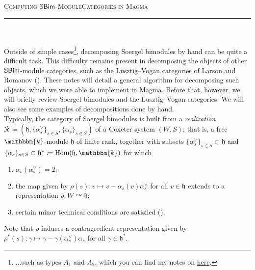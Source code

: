 



\thispagestyle{fancy}

\begin{center}
\LARGE\scshape Computing $\mathbb{S}\textup{\textsf{Bim}}$-Module\linebreak Categories in Magma\noindent\\[-\linespacing]
\rule{0.85\linewidth}{1pt}
\end{center}
\noindent\\[-0.75\linespacing]

\noindent\\ Outside of simple cases\footnote[2]{...such as types $A_1$ and $A_2$, which you can find my notes on \href{https://delphinoid.github.io/research/11/IndecomposableSoergelBimodulesA2.pdf}{here}.}, decomposing Soergel bimodules by hand can be quite a difficult task. This difficulty remains present in decomposing the objects of other $\mathbb{S}\textup{\textsf{Bim}}$-module categories, such as the Lusztig--Vogan categories of Larson and Romanov (\cite{LR22}). These notes will detail a general algorithm for decomposing such objects, which we were able to implement in Magma. Before that, however, we will briefly review Soergel bimodules and the Lusztig--Vogan categories. We will also see some examples of decompositions done by hand.\\

\noindent Typically, the category of Soergel bimodules is built from a {\em realization} $\mathcal{R} \coloneqq (\mathfrak{h}, \{\alpha_s^\vee\}_{s \in S}, \{\alpha_s\}_{s \in S})$ of a Coxeter system $(W, S)$; that is, a free $\mathbbm{k}$-module $\mathfrak{h}$ of finite rank, together with subsets $ \{\alpha_s^\vee\}_{s \in S} \subset \mathfrak{h}$ and $ \{\alpha_s\}_{s \in S} \subset \mathfrak{h}^* \coloneqq \homset(\mathfrak{h}, \mathbbm{k})$ for which
\begin{enumerate}[label=\textup{(\roman*).}, ref=\textup{(\roman*)}, leftmargin=4\parindent]
\item $\alpha_s(\alpha_s^\vee) = 2$;
\item the map given by $\rho(s) : v \mapsto v - \alpha_s(v)\alpha_s^\vee$ for all $v \in \mathfrak{h}$ extends to a representation $\rho : W \curvearrowright \mathfrak{h}$;
\item certain minor technical conditions are satisfied (\cite[\S 5.7]{EMTW20}).
\end{enumerate}
\noindent Note that $\rho$ induces a contragredient representation given by $\rho^*(s) : \gamma \mapsto \gamma - \gamma(\alpha_s^\vee)\alpha_s$ for all $\gamma \in \mathfrak{h}^*$.\\

